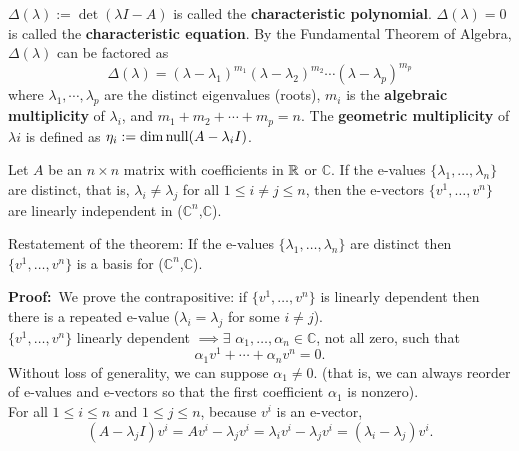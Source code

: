 \begin{definition}
$\Delta (\lambda) := \det(\lambda I - A) $ is called the \textbf{characteristic polynomial}. $ \Delta (\lambda) = 0$ is called the \textbf{characteristic equation}. By the Fundamental Theorem of Algebra, $\Delta (\lambda)$ can be factored as
$$ \Delta (\lambda) = (\lambda - \lambda_1)^{m_1}(\lambda - \lambda_2)^{m_2}\dotsb(\lambda - \lambda_p)^{m_p} $$
where $\lambda_1, \dotsb, \lambda_p$ are the distinct eigenvalues (roots), $m_i$ is the \textbf{algebraic multiplicity} of $\lambda_i$, and  $m_1 + m_2 + \cdots + m_p = n.$ The \textbf{geometric multiplicity} of $\lambda i$ is defined as $\eta_i:= \dim \mathrm{null}(A - \lambda_iI)$.

\end{definition}



\begin{thm}
Let $A$ be an $n \times n$ matrix with coefficients in $\mathbb R$ or $\mathbb{C}$. If the e-values $\{ \lambda_1,\ldots, \lambda_n \}$ are distinct, that is, $\lambda_i \neq \lambda_j $ for all $1 \le i \neq j \le n$, then the e-vectors $\{ v^1,\ldots,v^n \}$ are linearly independent in ($\mathbb{C}^n$,$\mathbb{C}$).
\end{thm} 

\begin{rem}
Restatement of the theorem: If the e-values $\{ \lambda_1,  \ldots,\lambda_n \}$ are distinct then $\{ v^1,  \ldots,v^n \}$ is a basis for ($\mathbb{C}^n$,$\mathbb{C}$).
\end{rem}

\textbf{Proof:}~We prove the contrapositive: if $\{ v^1,  \ldots,v^n \}$ is linearly dependent then there is a repeated e-value ($\lambda_i = \lambda_j$ for some $ i \neq j$). \\

$\{ v^1,  \ldots,v^n \}$ linearly dependent $\implies \exists$  $\alpha_1,  \ldots,\alpha_n \in \mathbb{C}$, not all zero, such that 
\begin{equation}
\label{eq:EvectorDependent}
     \alpha_1 v^1 + \dotsb + \alpha_n v^n = 0.
\end{equation}
   Without loss of generality, we can suppose $\alpha_1 \neq 0$. (that is, we can always reorder of e-values and e-vectors so that the first coefficient $\alpha_1$ is nonzero).\\
   
For all $1 \le i \le n$ and $1 \le j \le n$, because $v^i$ is an e-vector,
$$(A - \lambda_j I)v^i = A v^i - \lambda_j v^i = \lambda_i v^i - \lambda_j v^i = (\lambda_i - \lambda_j) v^i.$$

